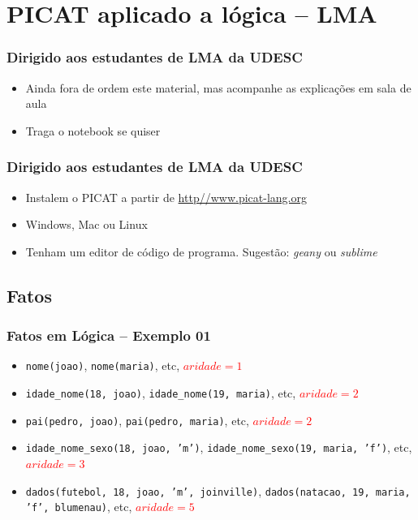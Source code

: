 \documentclass[10pt]{beamer}
\begin{document}

\section{PICAT aplicado a lógica -- LMA}
\begin{frame}
    \frametitle{Dirigido aos estudantes de LMA da UDESC}
    \begin{itemize}
    \item Ainda fora de ordem este material, mas acompanhe as explicações
    em sala de aula
    \item Traga o notebook se quiser
    \end{itemize}
\end{frame}


\begin{frame}[fragile]
    \frametitle{Dirigido aos estudantes de LMA da UDESC}
    \begin{itemize}
    \item Instalem o PICAT a partir de \url{http//www.picat-lang.org}
    \item Windows, Mac ou Linux
    \item Tenham um editor de código de programa. Sugestão: \textit{geany} ou \textit{sublime}
    \end{itemize}
\end{frame}


\subsection{Fatos}
\begin{frame}
    \frametitle{Fatos em Lógica  -- Exemplo 01}
    \begin{itemize}
    \item \texttt{nome(joao)}, \texttt{nome(maria)}, etc, \textcolor{red}{$aridade=1$} 
    \item \texttt{idade\_nome(18, joao)}, \texttt{idade\_nome(19, maria)}, etc, \textcolor{red}{$aridade=2$}
    \item \texttt{pai(pedro, joao)}, \texttt{pai(pedro, maria)}, etc, \textcolor{red}{$aridade=2$}
    \item \texttt{idade\_nome\_sexo(18, joao, 'm')}, \texttt{idade\_nome\_sexo(19, maria, 'f')}, etc, \textcolor{red}{$aridade=3$}
    \item \texttt{dados(futebol, 18, joao, 'm', joinville)}, \texttt{dados(natacao, 19, maria, 'f', blumenau)}, etc, \textcolor{red}{$aridade=5$}
    \end{itemize}
\end{frame}
\end{document}

